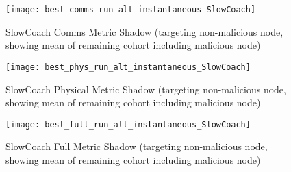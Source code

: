 \documentclass[aspectratio=169]{beamer}
\begin{document}
\begin{frame}\begin{figure}[h]
	\centering
	\texttt{[image: best\_comms\_run\_alt\_instantaneous\_SlowCoach]}
	\caption{SlowCoach Comms Metric Shadow (targeting non-malicious node, showing mean of remaining cohort including malicious node)}
	\label{fig:comms_alt_instantaneous_slowcoach}
\end{figure}\end{frame}

\begin{frame}\begin{figure}[h]
	\centering
	\texttt{[image: best\_phys\_run\_alt\_instantaneous\_SlowCoach]}
	\caption{SlowCoach Physical Metric Shadow (targeting non-malicious node, showing mean of remaining cohort including malicious node)}
	\label{fig:phys_alt_instantaneous_slowcoach}
\end{figure}\end{frame}

\begin{frame}\begin{figure}[h]
	\centering
	\texttt{[image: best\_full\_run\_alt\_instantaneous\_SlowCoach]}
	\caption{SlowCoach Full Metric Shadow (targeting non-malicious node, showing mean of remaining cohort including malicious node)}
	\label{fig:full_alt_instantaneous_slowcoach}
\end{figure}\end{frame}
\end{document}
